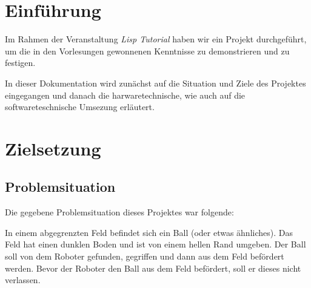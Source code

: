 \documentclass{fetch-my-doc}
\begin{document}
	\sloppy
	
	\addtolength{\textheight}{\versch}
	\printtodo
	\tableofcontents
	\clearpage
	
	
	
	\section{Einführung}\label{sec:Einfuehrung}
		
		Im Rahmen der Veranstaltung \textit{Lisp Tutorial} haben wir ein Projekt durchgeführt, um die in den Vorlesungen gewonnenen Kenntnisse zu demonstrieren und zu festigen.
		
		In dieser Dokumentation wird zunächst auf die Situation und Ziele des Projektes eingegangen und danach die harwaretechnische, wie auch auf die softwareteschnische Umsezung erläutert.
		
		\section{Zielsetzung}
		
			\subsection{Problemsituation}
			
			Die gegebene Problemsituation dieses Projektes war folgende: 
		
			In einem abgegrenzten Feld befindet sich ein Ball (oder etwas ähnliches). Das Feld hat einen dunklen Boden und ist von einem hellen Rand umgeben. Der Ball soll von dem Roboter gefunden, gegriffen und dann aus dem Feld befördert werden. Bevor der Roboter den Ball aus dem Feld befördert, soll er dieses nicht verlassen.
		
\end{document}
